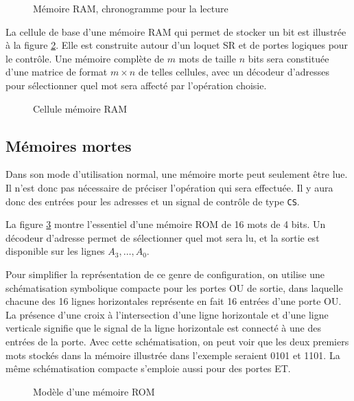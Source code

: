 \documentclass[11pt]{article}
\begin{document}
\begin{figure}[htbp]
\centering

\caption{\label{fig:org77219c2}Mémoire RAM, chronogramme pour la lecture}
\end{figure}

La cellule de base d'une mémoire RAM qui permet de stocker un bit est
illustrée à la figure \ref{fig:org4147856}. Elle est construite autour d'un
loquet SR et de portes logiques pour le contrôle. Une mémoire complète
de \(m\) mots de taille \(n\) bits sera constituée d'une matrice de
format \(m \times n\) de telles cellules, avec un décodeur d'adresses
pour sélectionner quel mot sera affecté par l'opération choisie.

\begin{figure}[htbp]
\centering

\caption{\label{fig:org4147856}Cellule mémoire RAM}
\end{figure}


\subsection{Mémoires mortes}
\label{sec:orgc86743d}

Dans son mode d'utilisation normal, une mémoire morte peut seulement
être lue. Il n'est donc pas nécessaire de préciser l'opération qui
sera effectuée. Il y aura donc des entrées pour les adresses et un
signal de contrôle de type \texttt{CS}.

La figure \ref{fig:orgc90b4bb} montre l'essentiel d'une mémoire ROM de
16 mots de 4 bits. Un décodeur d'adresse permet de sélectionner quel
mot sera lu, et la sortie est disponible sur les lignes \(A_3, \ldots,
A_0\). 

Pour simplifier la représentation de ce genre de configuration, on
utilise une schématisation symbolique compacte pour les portes OU de
sortie, dans laquelle chacune des 16 lignes horizontales représente en
fait 16 entrées d'une porte OU. La présence d'une croix à
l'intersection d'une ligne horizontale et d'une ligne verticale
signifie que le signal de la ligne horizontale est connecté à une des
entrées de la porte.  Avec cette schématisation, on peut voir que les
deux premiers mots stockés dans la mémoire illustrée dans l'exemple
seraient 0101 et 1101. La même schématisation compacte s'emploie aussi
pour des portes ET.


\begin{figure}[htbp]
\centering

\caption{\label{fig:orgc90b4bb}Modèle d'une mémoire ROM}
\end{figure}
\end{document}
